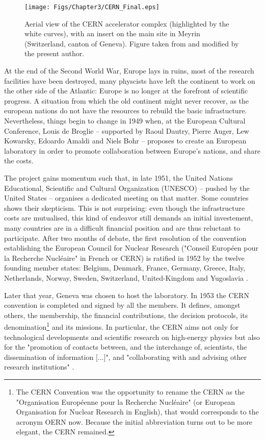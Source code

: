\begin{figure}[t]
	\centering
	\texttt{[image: Figs/Chapter3/CERN\_Final.eps]}
	\caption{Aerial view of the CERN accelerator complex (highlighted by the white curves), with an insert on the main site in Meyrin (Switzerland, canton of Geneva). Figure taken from \cite{PuzzleGrandCollisionneur} and modified by the present author.}
	\label{fig:CERNView}
\end{figure}

At the end of the Second World War, Europe lays in ruins, most of the research facilities have been destroyed, many physcists have left the continent to work on the other side of the Atlantic: Europe is no longer at the forefront of scientific progress. A situation from which the old continent might never recover, as the european nations do not have the resources to rebuild the basic infrastucture. Nevertheless, things begin to change in 1949 when, at the European Cultural Conference, Louis de Broglie -- supported by Raoul Dautry, Pierre Auger, Lew Kowarsky, Edoardo Amaldi and Niels Bohr -- proposes to create an European laboratory in order to promote collaboration between Europe's nations, and share the costs.

The project gains momentum such that, in late 1951, the United Nations Educational, Scientific and Cultural Organization (UNESCO) -- pushed by the United States -- organises a dedicated meeting on that matter. Some countries shows their skepticism. This is not surprising: even though the infrastructure costs are mutualised, this kind of endeavor still demands an initial investement, many countries are in a difficult financial position and are thus reluctant to participate. After two months of debate, the first resolution of the convention establishing the European Council for Nuclear Research ("Conseil Européen pour la Recherche Nucléaire" in French or CERN) is ratified in 1952 by the twelve founding member states: Belgium, Denmark, France, Germany, Greece, Italy, Netherlands, Norway, Sweden, Switzerland, United-Kingdom and Yugoslavia \cite{deroseParis1951Birth2008}.

Later that year, Geneva was chosen to host the laboratory. In 1953 the CERN convention is completed and signed by all the members. It defines, amongst others, the membership, the financial contributions, the decision protocols, its denomination\footnote{The CERN Convention was the opportunity to rename the CERN as the "Organisation Européenne pour la Recherche Nucléaire" (or European Organisation for Nuclear Research in English), that would corresponds to the acronym OERN now. Because the initial abbreviation turns out to be more elegant, the CERN remained.} and its missions. In particular, the CERN aims not only for technological developments and scientific research on high-energy physics but also for the "promotion of contacts between, and the interchange of, scientists, the dissemination of information [...]", and "collaborating with and advising other research institutions" \cite{cerncouncilConventionEstablishmentEuropean1953}.\\

